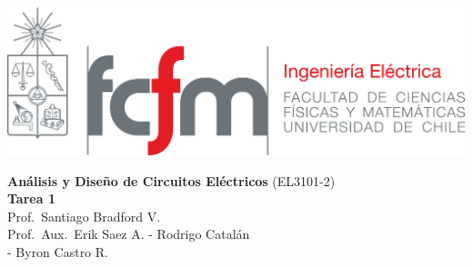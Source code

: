 \documentclass[
  11pt,
  letterpaper,
   addpoints,
  ]{exam}
\begin{document}
\noindent
\begin{minipage}{0.47\textwidth}
\includegraphics[width=\textwidth]{../fcfm_die}
\end{minipage}
\begin{minipage}{0.53\textwidth}
    
\begin{center} 
\large\textbf{Análisis y Diseño de Circuitos Eléctricos} (EL3101-2) \\
\large\textbf{Tarea 1} \\
\normalsize Prof.~Santiago Bradford V.\\
\normalsize Prof.~Aux.~Erik Saez A. - Rodrigo Catalán\\
             - Byron Castro R.
\end{center}
\end{minipage}

\vspace{0.5cm}
\noindent
\vspace{.85cm}

\end{document}
